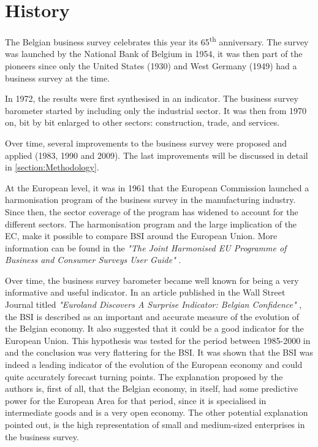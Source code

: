 \documentclass[12pt,a4paper,oneside]{book}
\begin{document}
\section{History}

The Belgian business survey celebrates this year its 65\textsuperscript{th} anniversary. The survey was launched by the National Bank of Belgium in 1954, it was then part of the pioneers since only the United States (1930) and West Germany (1949) had a business survey at the time.

In 1972, the results were first synthesised in an indicator.
The business survey barometer started by including only the industrial sector. It was then from 1970 on, bit by bit enlarged to other sectors: construction, trade, and services.

Over time, several improvements to the business survey were proposed and applied (1983, 1990 and 2009). The last improvements will be discussed in detail in \autoref{section:Methodology}.

At the European level, it was in 1961 that the European Commission launched a harmonisation program of the business survey in the manufacturing industry. 
Since then, the sector coverage of the program has widened to account for the different sectors.
The harmonisation program and the large implication of the EC, make it possible to compare BSI around the European Union.
More information can be found in the \textit{"The Joint Harmonised EU Programme of Business and Consumer Surveys User Guide"} \cite{european_commission_joint_2016}.

Over time, the business survey barometer became well known for being a very informative and useful indicator. 
In an article published in the Wall Street Journal titled \textit{"Euroland Discovers A Surprise Indicator: Belgian Confidence"} \citep{rhoads_euroland_1999}, the BSI is described as an important and accurate measure of the evolution of the Belgian economy. 
It also suggested that it could be a good indicator for the European Union. 
This hypothesis was tested for the period between 1985-2000 in \cite{vanhaelen_belgian_2000} and the conclusion was very flattering for the BSI. 
It was shown that the BSI was indeed a leading indicator of the evolution of the European economy and could quite accurately forecast turning points. 
The explanation proposed by the authors is, first of all, that the Belgian economy, in itself, had some predictive power for the European Area for that period, since it is specialised in intermediate goods and is a very open economy. 
The other potential explanation pointed out, is the high representation of small and medium-sized enterprises in the business survey.
\end{document}
